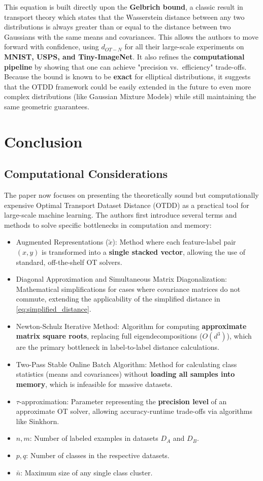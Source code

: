 \documentclass[11pt, a4paper]{article}
\theoremstyle{plain} %
\theoremstyle{definition} %
\begin{document}
			This equation is built directly upon the \textbf{Gelbrich bound}, a classic result in transport theory which states that the Wasserstein distance between any two distributions is always greater than or equal to the distance between two Gaussians with the same means and covariances. This allows the authors to move forward with confidence, using $d_{OT-N}$ for all their large-scale experiments on \textbf{MNIST, USPS, and Tiny-ImageNet}. It also refines the \textbf{computational pipeline} by showing that one can achieve "precision vs.\ efficiency" trade-offs. Because the bound is known to be \textbf{exact} for elliptical distributions, it suggests that the OTDD framework could be easily extended in the future to even more complex distributions (like Gaussian Mixture Models) while still maintaining the same geometric guarantees.


	\section{Conclusion}
	\label{sec:conclusion}
		\subsection{Computational Considerations}
		\label{sec:computational_considerations}
			The paper now focuses on presenting the theoretically sound but computationally expensive Optimal Transport Dataset Distance (OTDD) as a practical tool for large-scale machine learning.
			The authors first introduce several terms and methods to solve specific bottlenecks in computation and memory:
			\begin{itemize}
				\item Augmented Representations ($\tilde{x}$): Method where each feature-label pair $(x, y)$ is transformed into a \textbf{single stacked vector}, allowing the use of standard, off-the-shelf OT solvers.
				\item Diagonal Approximation and Simultaneous Matrix Diagonalization: Mathematical simplifications for cases where covariance matrices do not commute, extending the applicability of the simplified distance in \cref{eq:simplified_distance}.
				\item Newton-Schulz Iterative Method: Algorithm for computing \textbf{approximate matrix square roots}, replacing full eigendecompositions ($O(d^3)$), which are the primary bottleneck in label-to-label distance calculations.
				\item Two-Pass Stable Online Batch Algorithm: Method for calculating class statistics (means and covariances) without \textbf{loading all samples into memory}, which is infeasible for massive datasets.
				\item $\tau$-approximation: Parameter representing the \textbf{precision level} of an approximate OT solver, allowing accuracy-runtime trade-offs via algorithms like Sinkhorn.
				\item $n, m$: Number of labeled examples in datasets $D_A$ and $D_B$.
				\item $p, q$: Number of classes in the respective datasets.
				\item $\bar{n}$: Maximum size of any single class cluster.
			\end{itemize}
\end{document}
